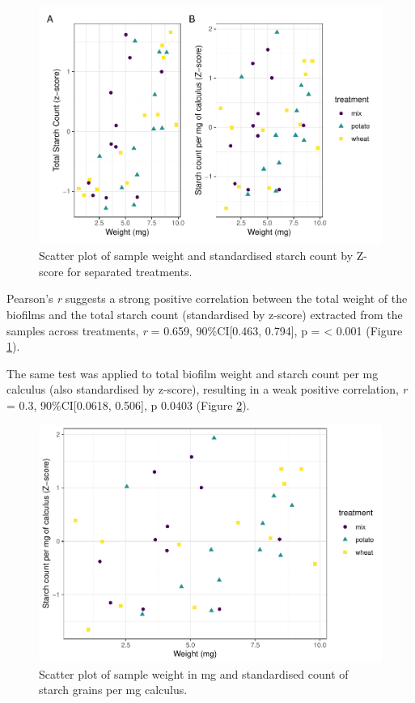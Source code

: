 \documentclass[
]{article}
\begin{document}
\begin{figure}
\centering
\includegraphics{../figures/cor-plot-1.pdf}
\caption{\label{fig:cor-plot}Scatter plot of sample weight and standardised starch count by Z-score for separated treatments.}
\end{figure}

Pearson's \emph{r} suggests a
strong positive
correlation between the total weight of the biofilms and the total starch count
(standardised by z-score) extracted from the samples across treatments,
\emph{r} = 0.659,
90\%CI{[}0.463, 0.794{]},
p = \textless{} 0.001
(Figure \ref{fig:cor-plot}).

The same test was applied to total biofilm weight and starch count per mg
calculus (also standardised by z-score), resulting in a weak positive correlation,
\emph{r} = 0.3,
90\%CI{[}0.0618, 0.506{]},
p 0.0403
(Figure \ref{fig:cor-plot2}).

\begin{figure}
\centering
\includegraphics{../figures/cor-plot2-1.pdf}
\caption{\label{fig:cor-plot2}Scatter plot of sample weight in mg and standardised count of starch grains per mg calculus.}
\end{figure}
\end{document}
